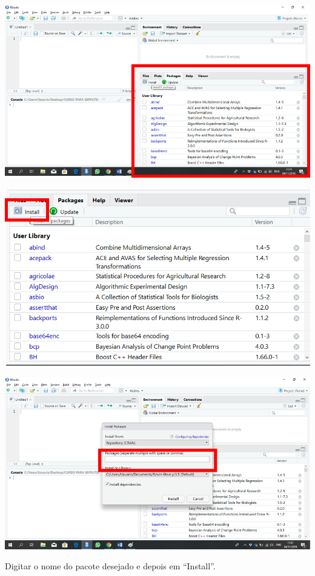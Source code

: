 \documentclass[
]{book}
\begin{document}
\includegraphics{install11.png}

\includegraphics{install12.png}

\includegraphics{install13.png}

Digitar o nome do pacote desejado e depois em ``Install''.
\end{document}
